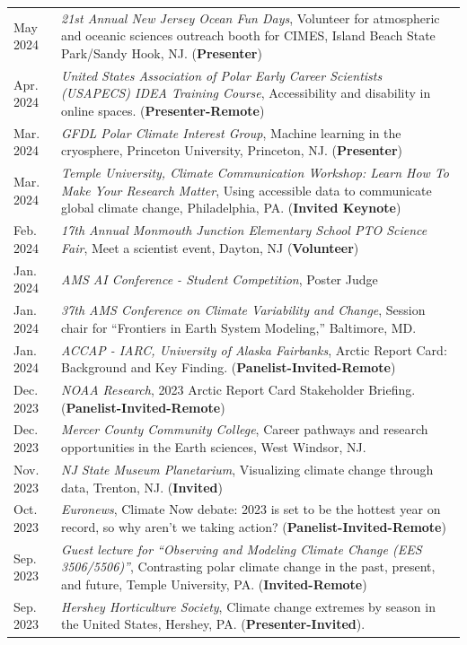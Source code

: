 \documentclass[margin,line,palatino,courier,10pt]{res}
\begin{document}
\begin{resume}
\begin{tabular}{@{}p{0.9in}p{4in}}
May 2024 & \textit{21st Annual New Jersey Ocean Fun Days}, Volunteer for atmospheric and oceanic sciences outreach booth for CIMES, Island Beach State Park/Sandy Hook, NJ. (\textbf{Presenter})\\
Apr. 2024 & \textit{United States Association of Polar Early Career Scientists (USAPECS) IDEA Training Course}, Accessibility and disability in online spaces. (\textbf{Presenter-Remote})\\
Mar. 2024 & \textit{GFDL Polar Climate Interest Group}, Machine learning in the cryosphere, Princeton University, Princeton, NJ. (\textbf{Presenter})\\
Mar. 2024 & \textit{Temple University, Climate Communication Workshop: Learn How To Make Your Research Matter}, Using accessible data to communicate global climate change, Philadelphia, PA. (\textbf{Invited Keynote})\\
Feb. 2024 & \textit{17th Annual Monmouth Junction Elementary School PTO Science Fair}, Meet a scientist event, Dayton, NJ (\textbf{Volunteer})\\
Jan. 2024 & \textit{AMS AI Conference - Student Competition}, Poster Judge\\ 
Jan. 2024 & \textit{37th AMS Conference on Climate Variability and Change}, Session chair for ``Frontiers in Earth System Modeling,'' Baltimore, MD.\\ 
Jan. 2024 & \textit{ACCAP - IARC, University of Alaska Fairbanks}, Arctic Report Card: Background and Key Finding. (\textbf{Panelist-Invited-Remote})\\
Dec. 2023 & \textit{NOAA Research}, 2023 Arctic Report Card Stakeholder Briefing. (\textbf{Panelist-Invited-Remote})\\
Dec. 2023 & \textit{Mercer County Community College}, Career pathways and research opportunities in the Earth sciences, West Windsor, NJ.\\ 
Nov. 2023 & \textit{NJ State Museum Planetarium}, Visualizing climate change through data, Trenton, NJ. (\textbf{Invited})\\ 
Oct. 2023 & \textit{Euronews}, Climate Now debate: 2023 is set to be the hottest year on record, so why aren't we taking action? (\textbf{Panelist-Invited-Remote})\\
Sep. 2023 & \textit{Guest lecture for ``Observing and Modeling Climate Change (EES 3506/5506)''}, Contrasting polar climate change in the past, present, and future, Temple University, PA. (\textbf{Invited-Remote})\\
Sep. 2023 & \textit{Hershey Horticulture Society}, Climate change extremes by season in the United States, Hershey, PA. (\textbf{Presenter-Invited}). \\

\end{tabular}
\end{resume}
\end{document}
